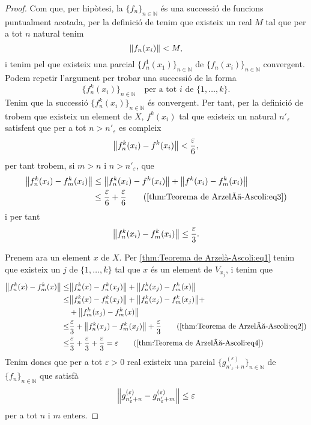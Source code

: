 \documentclass[../Apunts.tex]{subfiles}
\begin{document}
\begin{lemma}
\begin{proof}
			Com que, per hipòtesi, la \(\{f_{n}\}_{n\in\mathbb{N}}\) és una successió de funcions puntualment acotada, per la definició de  tenim que existeix un real \(M\) tal que per a tot \(n\) natural tenim
			\[\norm{f_{n}(x_{i})}<M,\]
			i tenim pel  que existeix una parcial \(\{f_{n}^{1}(x_{1})\}_{n\in\mathbb{N}}\) de \(\{f_{n}(x_{i})\}_{n\in\mathbb{N}}\) convergent. Podem repetir l'argument per trobar una successió de la forma
			\[\{f^{k}_{n}(x_{i})\}_{n\in\mathbb{N}}\quad\text{per a tot }i\text{ de }\{1,\dots,k\}.\]
			Tenim que la successió \(\{f^{k}_{n}(x_{i})\}_{n\in\mathbb{N}}\) és convergent. Per tant, per la definició de  trobem que existeix un element de \(X\), \(f^{k}(x_{i})\) tal que existeix un natural \(n'_{\varepsilon}\) satisfent que per a tot \(n>n'_{\varepsilon}\) es compleix
			\begin{equation}
				\label{thm:Teorema de Arzelà-Ascoli:eq3}
				\norm{f^{k}_{n}(x_{i})-f^{k}(x_{i})}<\frac{\varepsilon}{6},
			\end{equation}
			per tant trobem, si \(m>n\) i \(n>n'_{\varepsilon}\), que
			\begin{align*}
				\norm{f^{k}_{n}(x_{i})-f^{k}_{m}(x_{i})}&\leq\norm{f^{k}_{n}(x_{i})-f^{k}(x_{i})}+\norm{f^{k}(x_{i})-f^{k}_{m}(x_{i})} \\
				&\leq\frac{\varepsilon}{6}+\frac{\varepsilon}{6} \tag{\ref{thm:Teorema de Arzelà-Ascoli:eq3}}
			\end{align*}
			i per tant
			\begin{equation}
				\label{thm:Teorema de Arzelà-Ascoli:eq4}
				\norm{f^{k}_{n}(x_{i})-f^{k}_{m}(x_{i})}\leq\frac{\varepsilon}{3}.
			\end{equation}
			
			Prenem ara un element \(x\) de \(X\). Per \eqref{thm:Teorema de Arzelà-Ascoli:eq1} tenim que existeix un \(j\) de \(\{1,\dots,k\}\) tal que \(x\) és un element de \(V_{x_{j}}\), i tenim que
			\begin{align*}
				\norm{f^{k}_{n}(x)-f^{k}_{m}(x)}\leq&\norm{f^{k}_{n}(x)-f^{k}_{n}(x_{j})}+\norm{f^{k}_{n}(x_{j})-f^{k}_{m}(x)} \\
				\leq&\norm{f^{k}_{n}(x)-f^{k}_{n}(x_{j})}+\norm{f^{k}_{n}(x_{j})-f^{k}_{m}(x_{j})}+\\&+\norm{f^{k}_{m}(x_{j})-f^{k}_{m}(x)} \\
				\leq&\frac{\varepsilon}{3}+\norm{f^{k}_{n}(x_{j})-f^{k}_{m}(x_{j})}+\frac{\varepsilon}{3}\tag{\ref{thm:Teorema de Arzelà-Ascoli:eq2}} \\
				\leq&\frac{\varepsilon}{3}+\frac{\varepsilon}{3}+\frac{\varepsilon}{3}=\varepsilon\tag{\ref{thm:Teorema de Arzelà-Ascoli:eq4}}
			\end{align*}
			Tenim doncs que per a tot \(\varepsilon>0\) real existeix una parcial \(\{g^{(\varepsilon)}_{n'_{\varepsilon}+n}\}_{n\in\mathbb{N}}\) de \(\{f_{n}\}_{n\in\mathbb{N}}\) que satisfà
			\[\norm{g^{(\varepsilon)}_{n'_{\varepsilon}+n}-g^{(\varepsilon)}_{n'_{\varepsilon}+m}}\leq\varepsilon\]
			per a tot \(n\) i \(m\) enters.
			

\end{proof}
\end{lemma}
\end{document}

